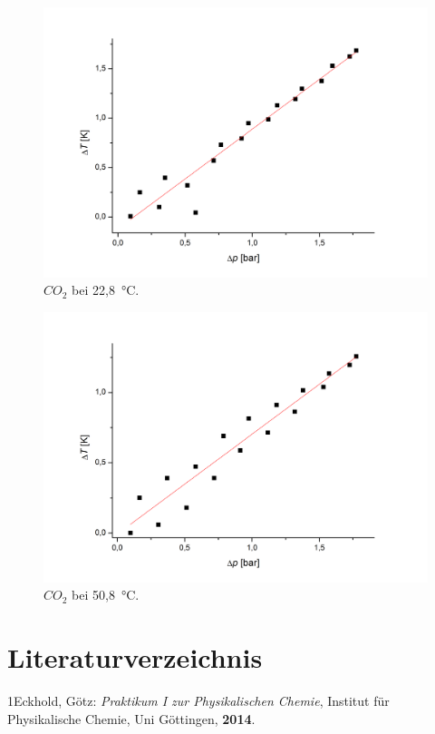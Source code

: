 \documentclass[a4paper,12pt,oneside,onecolum,final,openany]{report}
\begin{document}
\begin{center}
\begin{figure}[h]
\includegraphics[width=13.5cm]{CO2bei20.png}
\caption{$CO_2$ bei 22,8~°C.}
\end{figure}
\end{center}
\begin{center}
\begin{figure}[h]
\includegraphics[width=13.5cm]{CO2bei50,8.png}
\caption{$CO_2$ bei 50,8~°C.}
\end{figure}
\end{center}
\newpage




\chapter{Literaturverzeichnis}
1\quad Eckhold, Götz: \emph{Praktikum I zur Physikalischen Chemie}, Institut für Physikalische Chemie, Uni Göttingen, \textbf{2014}.
\end{document}
